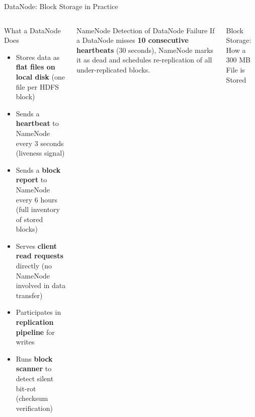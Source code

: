 \documentclass[aspectratio=169,10pt]{beamer}
\begin{document}
\begin{frame}{DataNode: Block Storage in Practice}
  \begin{columns}[T]
      \begin{block}{What a DataNode Does}
        \begin{itemize}
          \item Stores data as \textbf{flat files on local disk} (one file per HDFS block)
          \item Sends a \textbf{heartbeat} to NameNode every 3 seconds (liveness signal)
          \item Sends a \textbf{block report} to NameNode every 6 hours (full inventory of stored blocks)
          \item Serves \textbf{client read requests} directly (no NameNode involved in data transfer)
          \item Participates in \textbf{replication pipeline} for writes
          \item Runs \textbf{block scanner} to detect silent bit-rot (checksum verification)
        \end{itemize}
      \end{block}
      \vspace{4pt}
      \begin{alertblock}{NameNode Detection of DataNode Failure}
        If a DataNode misses \textbf{10 consecutive heartbeats} (30 seconds), NameNode marks it as dead and schedules re-replication of all under-replicated blocks.
      \end{alertblock}

      \begin{exampleblock}{Block Storage: How a 300 MB File is Stored}
        \begin{center}
\end{center}
\end{exampleblock}
\end{columns}
\end{frame}
\end{document}
